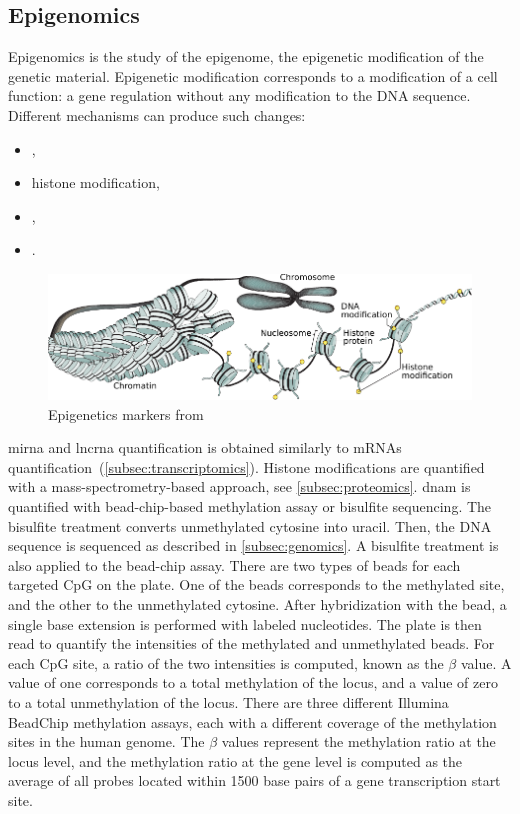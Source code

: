 \documentclass[../main.tex]{subfiles}
\begin{document}
	\subsection{Epigenomics}
		Epigenomics is the study of the epigenome, the epigenetic modification of the genetic material.
		Epigenetic modification corresponds to a modification of a cell function: a gene regulation without any modification to the DNA sequence.
		Different mechanisms can produce such changes:
		\begin{itemize}[nosep]
			\item {},
			\item histone modification,
			\item {},
			\item {}.
		\end{itemize}

		\begin{figure}[htbp]
			\centering
			\includegraphics[width=\textwidth]{epigenetics.pdf}
			\caption[Epigenetic markers]{Epigenetics markers from~\cite{Jones2016}}\label{fig:epigenetics}
		\end{figure}

		\gls{mirna} and \gls{lncrna} quantification is obtained similarly to mRNAs quantification~(\cref{subsec:transcriptomics}).
		Histone modifications are quantified with a mass-spectrometry-based approach, see \cref{subsec:proteomics}.
		\Gls{dnam} is quantified with bead-chip-based methylation assay or bisulfite sequencing.
		The bisulfite treatment converts unmethylated cytosine into uracil.
		Then, the DNA sequence is sequenced as described in \cref{subsec:genomics}.
		A bisulfite treatment is also applied to the bead-chip assay.
		There are two types of beads for each targeted CpG on the plate.
		One of the beads corresponds to the methylated site, and the other to the unmethylated cytosine.
		After hybridization with the bead, a single base extension is performed with labeled nucleotides.
		The plate is then read to quantify the intensities of the methylated and unmethylated beads.
		For each CpG site, a ratio of the two intensities is computed, known as the \(\beta\) value.
		A value of one corresponds to a total methylation of the locus, and a value of zero to a total unmethylation of the locus.
		There are three different Illumina BeadChip methylation assays, each with a different coverage of the methylation sites in the human genome.
		The \(\beta\) values represent the methylation ratio at the locus level, and the methylation ratio at the gene level is computed as the average of all probes located within 1500 base pairs of a gene transcription start site.
\end{document}
